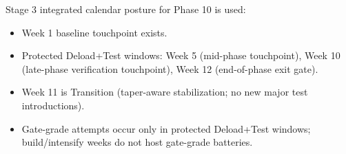 \documentclass[10pt]{article}
\begin{document}
\begin{landscape}
Stage 3 integrated calendar posture for Phase 10 is used:

\begin{itemize}
\item Week 1 baseline touchpoint exists.
\item Protected Deload+Test windows: Week 5 (mid-phase touchpoint), Week 10 (late-phase verification touchpoint), Week 12 (end-of-phase exit gate).
\item Week 11 is Transition (taper-aware stabilization; no new major test introductions).
\item Gate-grade attempts occur only in protected Deload+Test windows; build/intensify weeks do not host gate-grade batteries.
\end{itemize}

\end{landscape}
\end{document}
